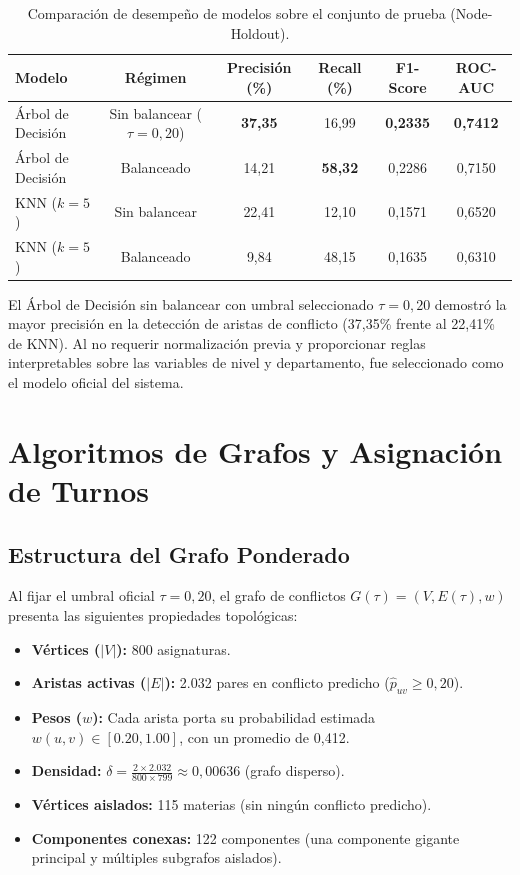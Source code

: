\documentclass[11pt,a4paper]{article}
\begin{document}
\begin{table}[htbp]
\centering
\caption{Comparación de desempeño de modelos sobre el conjunto de prueba (Node-Holdout).}
\label{tab:model_comparison}
\begin{tabularx}{\textwidth}{lccccc}
\toprule
\textbf{Modelo} & \textbf{Régimen} & \textbf{Precisión (\%)} & \textbf{Recall (\%)} & \textbf{F1-Score} & \textbf{ROC-AUC} \\
\midrule
Árbol de Decisión & Sin balancear ($\tau = 0,20$) & \textbf{37,35} & 16,99 & \textbf{0,2335} & \textbf{0,7412} \\
Árbol de Decisión & Balanceado & 14,21 & \textbf{58,32} & 0,2286 & 0,7150 \\
KNN ($k=5$) & Sin balancear & 22,41 & 12,10 & 0,1571 & 0,6520 \\
KNN ($k=5$) & Balanceado & 9,84 & 48,15 & 0,1635 & 0,6310 \\
\bottomrule
\end{tabularx}
\end{table}

El Árbol de Decisión sin balancear con umbral seleccionado $\tau = 0,20$ demostró la mayor precisión en la detección de aristas de conflicto (37,35\% frente al 22,41\% de KNN). Al no requerir normalización previa y proporcionar reglas interpretables sobre las variables de nivel y departamento, fue seleccionado como el modelo oficial del sistema.

\section{Algoritmos de Grafos y Asignación de Turnos}

\subsection{Estructura del Grafo Ponderado}
Al fijar el umbral oficial $\tau = 0,20$, el grafo de conflictos $G(\tau) = (V, E(\tau), w)$ presenta las siguientes propiedades topológicas:
\begin{itemize}
    \item \textbf{Vértices ($|V|$):} 800 asignaturas.
    \item \textbf{Aristas activas ($|E|$):} 2.032 pares en conflicto predicho ($\hat{p}_{uv} \ge 0,20$).
    \item \textbf{Pesos ($w$):} Cada arista porta su probabilidad estimada $w(u, v) \in [0.20, 1.00]$, con un promedio de 0,412.
    \item \textbf{Densidad:} $\delta = \frac{2 \times 2.032}{800 \times 799} \approx 0,00636$ (grafo disperso).
    \item \textbf{Vértices aislados:} 115 materias (sin ningún conflicto predicho).
    \item \textbf{Componentes conexas:} 122 componentes (una componente gigante principal y múltiples subgrafos aislados).
\end{itemize}
\end{document}
